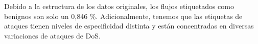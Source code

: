 \documentclass[10pt,a4paper,twoside]{article}
\begin{document}
\begin{multicols*}{2}
    \begin{table}[H]
        \begin{center}
        \end{center}
        \caption{Tiempos de análisis}
        \label{table:statstimeoffline}
    \end{table}

    \begin{table}[H]
        \begin{center}
        \end{center}
        \caption{Archivos generados durante el análisis}
        \label{table:generatedfilesoffline}
    \end{table}

    Debido a la estructura de los datos originales, los flujos etiquetados como benignos son solo un 0,846 \%. Adicionalmente, tenemos que las etiquetas de ataques tienen niveles de especificidad distinta y están concentradas en diversas variaciones de ataques de DoS.


\end{multicols*}
\end{document}
